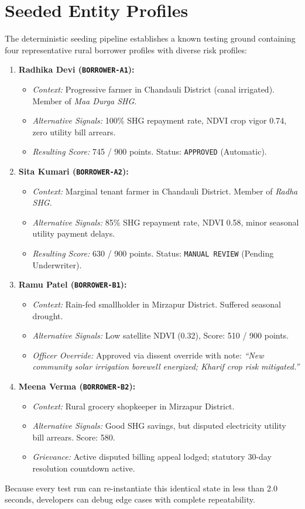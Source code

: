 \documentclass[11pt,a4paper,oneside]{report}
\begin{document}
\section{Seeded Entity Profiles}
The deterministic seeding pipeline establishes a known testing ground containing four representative rural borrower profiles with diverse risk profiles:

\begin{enumerate}
  \item \textbf{Radhika Devi (\texttt{BORROWER-A1}):}
    \begin{itemize}
      \item \textit{Context:} Progressive farmer in Chandauli District (canal irrigated). Member of \textit{Maa Durga SHG}.
      \item \textit{Alternative Signals:} 100\% SHG repayment rate, NDVI crop vigor 0.74, zero utility bill arrears.
      \item \textit{Resulting Score:} 745 / 900 points. Status: \texttt{APPROVED} (Automatic).
    \end{itemize}
  \item \textbf{Sita Kumari (\texttt{BORROWER-A2}):}
    \begin{itemize}
      \item \textit{Context:} Marginal tenant farmer in Chandauli District. Member of \textit{Radha SHG}.
      \item \textit{Alternative Signals:} 85\% SHG repayment rate, NDVI 0.58, minor seasonal utility payment delays.
      \item \textit{Resulting Score:} 630 / 900 points. Status: \texttt{MANUAL REVIEW} (Pending Underwriter).
    \end{itemize}
  \item \textbf{Ramu Patel (\texttt{BORROWER-B1}):}
    \begin{itemize}
      \item \textit{Context:} Rain-fed smallholder in Mirzapur District. Suffered seasonal drought.
      \item \textit{Alternative Signals:} Low satellite NDVI (0.32), Score: 510 / 900 points.
      \item \textit{Officer Override:} Approved via dissent override with note: \textit{``New community solar irrigation borewell energized; Kharif crop risk mitigated.''}
    \end{itemize}
  \item \textbf{Meena Verma (\texttt{BORROWER-B2}):}
    \begin{itemize}
      \item \textit{Context:} Rural grocery shopkeeper in Mirzapur District.
      \item \textit{Alternative Signals:} Good SHG savings, but disputed electricity utility bill arrears. Score: 580.
      \item \textit{Grievance:} Active disputed billing appeal lodged; statutory 30-day resolution countdown active.
    \end{itemize}
\end{enumerate}
Because every test run can re-instantiate this identical state in less than 2.0 seconds, developers can debug edge cases with complete repeatability.
\end{document}
